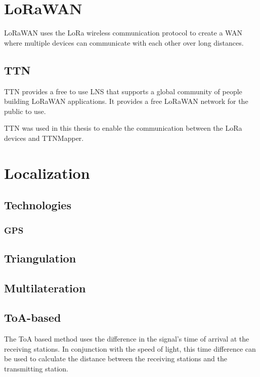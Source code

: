 \section{\acf{LoRaWAN}}

\ac{LoRaWAN} uses the LoRa wireless communication protocol to create a \ac{WAN} where multiple devices can communicate with each other over long distances.

\subsection{\acf{TTN}}

\ac{TTN} provides a free to use \ac{LNS} that supports a global community of people building \ac{LoRaWAN} applications.
It provides a free \ac{LoRaWAN} network for the public to use.

\ac{TTN} was used in this thesis to enable the communication between the \ac{LoRa} devices and TTNMapper.


\section{Localization}

\subsection{Technologies}

\subsubsection{\ac{GPS}}


\subsection{Triangulation}

\subsection{Multilateration}

\subsection{\acs{ToA}-based}

The \acf{ToA} based method uses the difference in the signal's time of arrival at the receiving stations.
In conjunction with the speed of light, this time difference can be used to calculate the distance between the receiving stations and the transmitting station.

